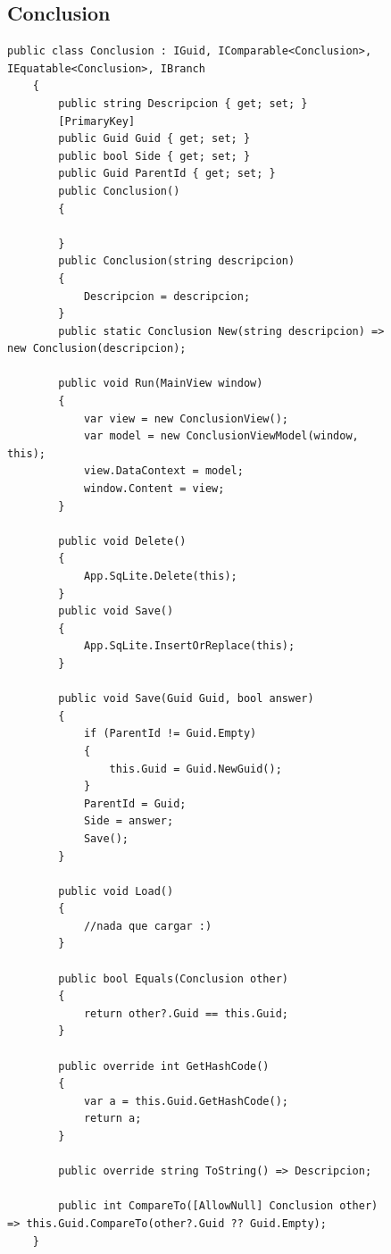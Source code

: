 \documentclass[conference]{IEEEtran}
\begin{document}
\begin{figure}[t]
    \subsection{Conclusion}
\begin{lstlisting}[language={[Sharp]C}, title={Conclusion}]
    public class Conclusion : IGuid, IComparable<Conclusion>, IEquatable<Conclusion>, IBranch
    {
        public string Descripcion { get; set; }
        [PrimaryKey]
        public Guid Guid { get; set; }
        public bool Side { get; set; }
        public Guid ParentId { get; set; }
        public Conclusion()
        {

        }
        public Conclusion(string descripcion)
        {
            Descripcion = descripcion;
        }
        public static Conclusion New(string descripcion) => new Conclusion(descripcion);

        public void Run(MainView window)
        {
            var view = new ConclusionView();
            var model = new ConclusionViewModel(window, this);
            view.DataContext = model;
            window.Content = view;
        }

        public void Delete()
        {
            App.SqLite.Delete(this);
        }
        public void Save()
        {
            App.SqLite.InsertOrReplace(this);
        }

        public void Save(Guid Guid, bool answer)
        {
            if (ParentId != Guid.Empty)
            {
                this.Guid = Guid.NewGuid();
            }
            ParentId = Guid;
            Side = answer;
            Save();
        }

        public void Load()
        {
            //nada que cargar :)
        }

        public bool Equals(Conclusion other)
        {
            return other?.Guid == this.Guid;
        }

        public override int GetHashCode()
        {
            var a = this.Guid.GetHashCode();
            return a;
        }

        public override string ToString() => Descripcion;

        public int CompareTo([AllowNull] Conclusion other) => this.Guid.CompareTo(other?.Guid ?? Guid.Empty);
    }
\end{lstlisting}
\end{figure}
\newpage
\end{document}
